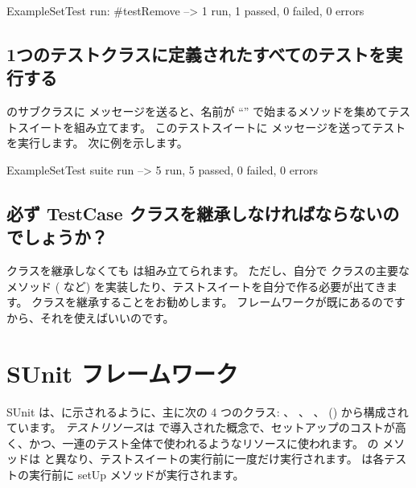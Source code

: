 \documentclass[a4paper,10pt,twoside]{book}
\begin{document}
\begin{code}{}
ExampleSetTest run: #testRemove --> 1 run, 1 passed, 0 failed, 0 errors
\end{code}

\subsection{1つのテストクラスに定義されたすべてのテストを実行する}

 のサブクラスに  メッセージを送ると、名前が ``'' で始まるメソッドを集めてテストスイートを組み立てます。
このテストスイートに  メッセージを送ってテストを実行します。
次に例を示します。

\begin{code}{}
ExampleSetTest suite run --> 5 run, 5 passed, 0 failed, 0 errors
\end{code}

\subsection{必ず TestCase クラスを継承しなければならないのでしょうか？}

 クラスを継承しなくても  は組み立てられます。
ただし、自分で  クラスの主要なメソッド ( など) を実装したり、テストスイートを自分で作る必要が出てきます。
 クラスを継承することをお勧めします。
フレームワークが既にあるのですから、それを使えばいいのです。


\section{SUnit フレームワーク}

SUnit は、に示されるように、主に次の 4 つのクラス:  、
 、  、  () から構成されています。
\emph{テストリソース}は  で導入された概念で、セットアップのコストが高く、かつ、一連のテスト全体で使われるようなリソースに使われます。
 の  メソッドは  と異なり、テストスイートの実行前に一度だけ実行されます。  は各テストの実行前に setUp メソッドが実行されます。
\end{document}
